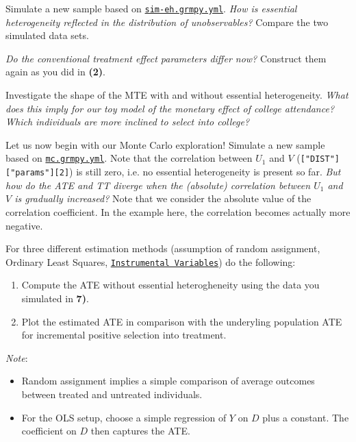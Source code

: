 \begin{boenumerate}\setcounter{enumi}{3}
  
  \item Simulate a new sample based on \href{https://github.com/HumanCapitalAnalysis/microeconometrics/blob/master/problem-sets/04-generalized-roy-model/sources/sim-eh.grmpy.yml}{\texttt{sim-eh.grmpy.yml}}. \emph{How is essential heterogeneity reflected in the distribution of unobservables?} Compare the two simulated data sets.
  
  \item \emph{Do the conventional treatment effect parameters differ now?} Construct them again as you did in \textbf{(2)}.
  
  \item Investigate the shape of the MTE with and without essential heterogeneity. \emph{What does this imply for our toy model of the monetary effect of college attendance? Which individuals are more inclined to select into college?}
  
  \item Let us now begin with our Monte Carlo exploration! Simulate a new sample based on \href{https://github.com/HumanCapitalAnalysis/microeconometrics/blob/master/problem-sets/04-generalized-roy-model/sources/mc.grmpy.yml}{\texttt{mc.grmpy.yml}}. Note that the correlation between $U_1$ and $V$ (\texttt{["DIST"]["params"][2]}) is still zero, i.e. no essential heterogeneity is present so far. \emph{But how do the ATE and TT diverge when the (absolute) correlation between $U_1$ and $V$ is gradually increased?} Note that we consider the absolute value of the correlation coefficient. In the example here, the correlation becomes actually more negative.
  
  \item For three different estimation methods (assumption of random assignment, Ordinary Least Squares, \href{https://bashtage.github.io/linearmodels/doc/iv/introduction.html}{\texttt{Instrumental Variables}}) do the following:
  \begin{enumerate}
  	\item Compute the ATE without essential heterogheneity using the data you simulated in \textbf{7)}.
  	\item Plot the estimated ATE in comparison with the underyling population ATE for incremental positive selection into treatment. 
  	
  \end{enumerate}

  \textit{Note}: 
  \begin{itemize}
  	\item Random assignment implies a simple comparison of average outcomes between treated and untreated individuals.
  	\item For the OLS setup, choose a simple regression of $Y$ on $D$ plus a constant. The coefficient on $D$ then captures the ATE. 
  	

\end{itemize}
\end{boenumerate}
